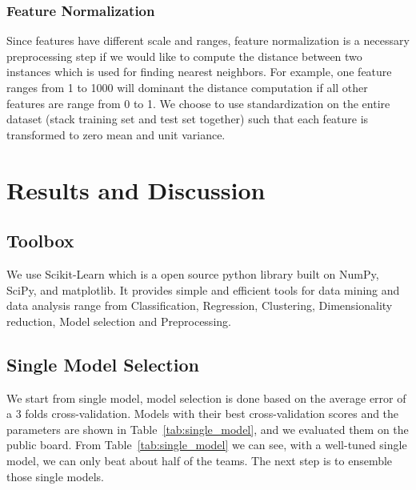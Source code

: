 \documentclass[10pt, oneside]{article}   	%
\newcommand\tabref{Table~\ref}
\begin{document}

\subsubsection{Feature Normalization}
Since features have different scale and ranges, feature normalization is a necessary preprocessing step if we would like to compute the distance between two instances which is used for finding nearest neighbors. 
For example, one feature ranges from 1 to 1000 will dominant the distance computation if all other features are range from 0 to 1.
We choose to use standardization on the entire dataset (stack training set and test set together) such that each feature is transformed to zero mean and unit variance.

\section{Results and Discussion}

\subsection{Toolbox}
We use Scikit-Learn which is a open source python library built on NumPy, SciPy, and matplotlib. 
It provides simple and efficient tools for data mining and data analysis range from Classification, Regression, Clustering, Dimensionality reduction, Model selection and Preprocessing.

\subsection{Single Model Selection}
We start from single model, model selection is done based on the average error of a 3 folds cross-validation.
Models with their best cross-validation scores and the parameters are shown in \tabref{tab:single_model}, and we evaluated them on the public board.
From \tabref{tab:single_model} we can see, with a well-tuned single model, we can only beat about half of the teams.
The next step is to ensemble those single models.
\end{document}
